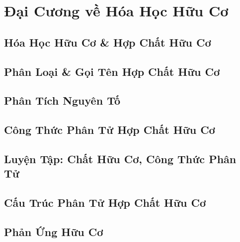 \documentclass[oneside]{book}
\numberwithin{equation}{section}
\begin{document}

\chapter{Đại Cương về Hóa Học Hữu Cơ}

\section{Hóa Học Hữu Cơ \& Hợp Chất Hữu Cơ}


\section{Phân Loại \& Gọi Tên Hợp Chất Hữu Cơ}


\section{Phân Tích Nguyên Tố}


\section{Công Thức Phân Tử Hợp Chất Hữu Cơ}


\section{Luyện Tập: Chất Hữu Cơ, Công Thức Phân Tử}


\section{Cấu Trúc Phân Tử Hợp Chất Hữu Cơ}


\section{Phản Ứng Hữu Cơ}
\end{document}
